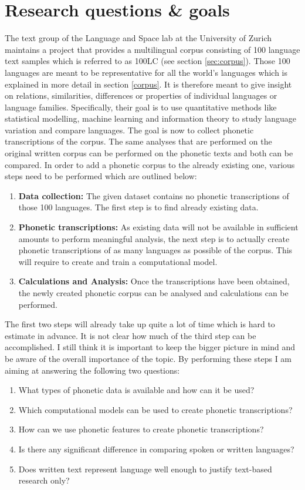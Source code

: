 \section{Research questions \& goals}
The text group of the Language and Space lab at the University of Zurich maintains a project that provides a multilingual corpus consisting of 100 language text samples \citep{UniversityofZurich.19.07.2021} which is referred to as 100LC (see section \ref{sec:corpus}). Those 100 languages are meant to be representative for all the world's languages which is explained in more detail in section \ref{corpus}. It is therefore meant to give insight on relations, similarities, differences or properties of individual languages or language families. Specifically, their goal is to use quantitative methods like statistical modelling, machine learning and information theory to study language variation and compare languages. The goal is now to collect phonetic transcriptions of the corpus. The same analyses that are performed on the original written corpus can be performed on the phonetic texts and both can be compared. In order to add a phonetic corpus to the already existing one, various steps need to be performed which are outlined below:
\begin{enumerate}
 \item \textbf{Data collection:} The given dataset contains no phonetic transcriptions of those 100 languages. The first step is to find already existing data. 
 \item \textbf{Phonetic transcriptions:} As existing data will not be available in sufficient amounts to perform meaningful analysis, the next step is to actually create phonetic transcriptions of as many languages as possible of the corpus. This will require to create and train a computational model.
 \item \textbf{Calculations and Analysis:} Once the transcriptions have been obtained, the newly created phonetic corpus can be analysed and calculations can be performed.
\end{enumerate}

The first two steps will already take up quite a lot of time which is hard to estimate in advance. It is not clear how much of the third step can be accomplished. I still think it is important to keep the bigger picture in mind and be aware of the overall importance of the topic. By performing these steps I am aiming at answering the following two questions:

\begin{enumerate}
\item What types of phonetic data is available and how can it be used?
\item Which computational models can be used to create phonetic transcriptions?
\item How can we use phonetic features to create phonetic transcriptions?
\item Is there any significant difference in comparing spoken or written languages?
\item Does written text represent language well enough to justify text-based research only?
\end{enumerate}

